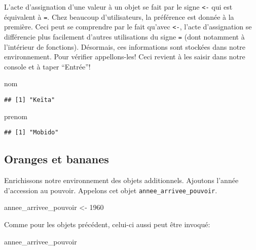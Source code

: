 \documentclass[]{book}
\newenvironment{Shaded}{\begin{snugshade}}{\end{snugshade}}
\newcommand{\DecValTok}[1]{\textcolor[rgb]{0.00,0.00,0.81}{#1}}
\newcommand{\StringTok}[1]{\textcolor[rgb]{0.31,0.60,0.02}{#1}}
\newcommand{\NormalTok}[1]{#1}
\begin{document}
L'acte d'assignation d'une valeur à un objet se fait par le signe
\texttt{\textless{}-} qui est équivalent à \texttt{=}. Chez beaucoup
d'utilisateurs, la préférence est donnée à la première. Ceci peut se
comprendre par le fait qu'avec \texttt{\textless{}-}, l'acte
d'assignation se différencie plus facilement d'autres utilisations du
signe \texttt{=} (dont notamment à l'intérieur de fonctions). Désormais,
ces informations sont stockées dans notre environnement. Pour vérifier
appellons-les! Ceci revient à les saisir dans notre console et à taper
``Entrée''!

\begin{Shaded}
\begin{Highlighting}[]
\NormalTok{nom}
\end{Highlighting}
\end{Shaded}

\begin{verbatim}
## [1] "Keïta"
\end{verbatim}

\begin{Shaded}
\begin{Highlighting}[]
\NormalTok{prenom}
\end{Highlighting}
\end{Shaded}

\begin{verbatim}
## [1] "Mobido"
\end{verbatim}

\subsection{Oranges et bananes}\label{oranges-et-bananes}

Enrichissons notre environnement des objets additionnels. Ajoutons
l'année d'accession au pouvoir. Appelons cet objet
\texttt{annee\_arrivee\_pouvoir}.

\begin{Shaded}
\begin{Highlighting}[]
\NormalTok{annee_arrivee_pouvoir <-}\StringTok{ }\DecValTok{1960}
\end{Highlighting}
\end{Shaded}

Comme pour les objets précédent, celui-ci aussi peut être invoqué:

\begin{Shaded}
\begin{Highlighting}[]
\NormalTok{annee_arrivee_pouvoir}
\end{Highlighting}
\end{Shaded}
\end{document}

